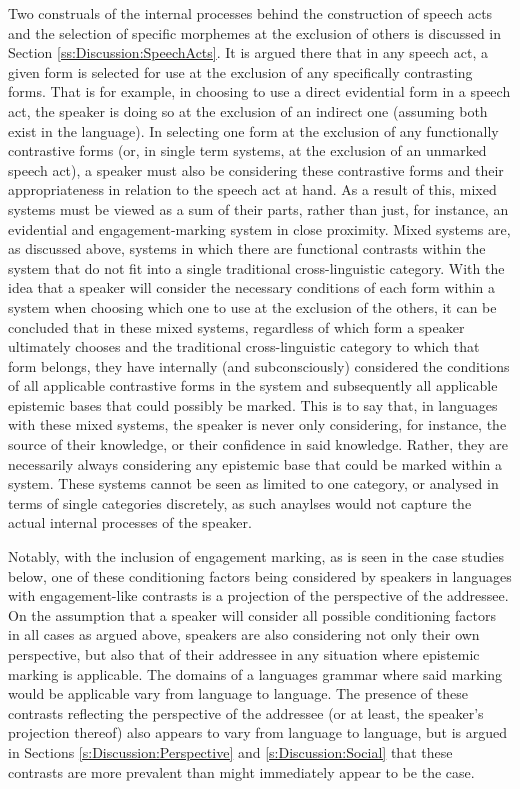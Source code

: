 Two construals of the internal processes behind the construction of speech acts and the selection of specific morphemes at the exclusion of others is discussed in Section \ref{ss:Discussion:SpeechActs}. It is argued there that in any speech act, a given form is selected for use at the exclusion of any specifically contrasting forms. That is for example, in choosing to use a direct evidential form in a speech act, the speaker is doing so at the exclusion of an indirect one (assuming both exist in the language). In selecting one form at the exclusion of any functionally contrastive forms (or, in single term systems, at the exclusion of an unmarked speech act), a speaker must also be considering these contrastive forms and their appropriateness in relation to the speech act at hand. As a result of this, mixed systems must be viewed as a sum of their parts, rather than just, for instance, an evidential and engagement-marking system in close proximity. Mixed systems are, as discussed above, systems in which there are functional contrasts within the system that do not fit into a single traditional cross-linguistic category. With the idea that a speaker will consider the necessary conditions of each form within a system when choosing which one to use at the exclusion of the others, it can be concluded that in these mixed systems, regardless of which form a speaker ultimately chooses and the traditional cross-linguistic category to which that form belongs, they have internally (and subconsciously) considered the conditions of all applicable contrastive forms in the system and subsequently all applicable epistemic bases that could possibly be marked. This is to say that, in languages with these mixed systems, the speaker is never only considering, for instance, the source of their knowledge, or their confidence in said knowledge. Rather, they are necessarily always considering any epistemic base that could be marked within a system. These systems cannot be seen as limited to one category, or analysed in terms of single categories discretely, as such anaylses would not capture the actual internal processes of the speaker.

Notably, with the inclusion of engagement marking, as is seen in the case studies below, one of these conditioning factors being considered by speakers in languages with engagement-like contrasts is a projection of the perspective of the addressee. On the assumption that a speaker will consider all possible conditioning factors in all cases as argued above, speakers are also considering not only their own perspective, but also that of their addressee in any situation where epistemic marking is applicable. The domains of a languages grammar where said marking would be applicable vary from language to language. The presence of these contrasts reflecting the perspective of the addressee (or at least, the speaker's projection thereof) also appears to vary from language to language, but is argued in Sections \ref{s:Discussion:Perspective} and \ref{s:Discussion:Social} that these contrasts are more prevalent than might immediately appear to be the case.

